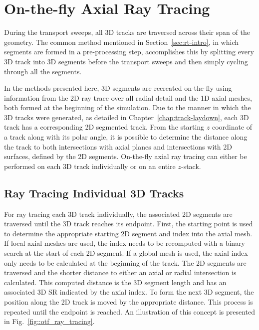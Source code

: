 \section{On-the-fly Axial Ray Tracing}

During the transport sweeps, all 3D tracks are traversed across their span of the geometry. The common method mentioned in Section~\ref{sec:rt-intro}, in which segments are formed in a pre-processing step, accomplishes this by splitting every 3D track into 3D segments before the transport sweeps and then simply cycling through all the segments.

In the methods presented here, 3D segments are recreated on-the-fly using information from the 2D ray trace over all radial detail and the 1D axial meshes, both formed at the beginning of the simulation. Due to the manner in which the 3D tracks were generated, as detailed in Chapter~\ref{chap:track-laydown}, each 3D track has a corresponding 2D segmented track. From the starting $z$ coordinate of a track along with its polar angle, it is possible to determine the distance along the track to both intersections with axial planes and intersections with 2D surfaces, defined by the 2D segments. On-the-fly axial ray tracing can either be performed on each 3D track individually or on an entire $z$-stack.

\subsection{Ray Tracing Individual 3D Tracks}

For ray tracing each 3D track individually, the associated 2D segments are traversed until the 3D track reaches its endpoint. First, the starting point is used to determine the appropriate starting 2D segment and index into the axial mesh. If local axial meshes are used, the index needs to be recomputed with a binary search at the start of each 2D segment. If a global mesh is used, the axial index only needs to be calculated at the beginning of the track. The 2D segments are traversed and the shorter distance to either an axial or radial intersection is calculated. This computed distance is the 3D segment length and has an associated 3D \ac{SR} indicated by the axial index. To form the next 3D segment, the position along the 2D track is moved by the appropriate distance. This process is repeated until the endpoint is reached. An illustration of this concept is presented in Fig.~\ref{fig::otf_ray_tracing}.

